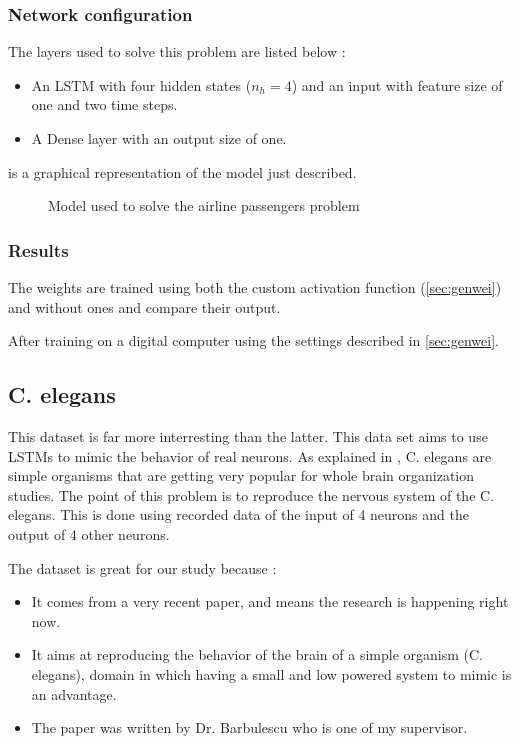 \subsubsection{Network configuration}

The layers used to solve this problem are listed below :

\begin{itemize}
  \item An \ac{LSTM} with four hidden states ($n_h=4$) and an input with feature size of one and two time steps.
  \item A Dense layer with an output size of one.
\end{itemize}

 is a graphical representation of the model just described.

\begin{figure}[H]
  \centering
  
  \caption{Model used to solve the airline passengers problem}
  \label{fig:airlineModel}
\end{figure}

\subsubsection{Results} %

The weights are trained using both the custom activation function (\cref{sec:genwei}) and without ones and compare their output.

After training on a digital computer using the settings described in \cref{sec:genwei}.

\subsection{\ac{C. elegans}}

This dataset is far more interresting than the latter. This data set aims to use \acp{LSTM} to mimic the behavior of real neurons. As explained in \cite{celegans}, \acf{C. elegans} are simple organisms that are getting very popular for whole brain organization studies. The point of this problem is to reproduce the nervous system of the \ac{C. elegans}. This is done using recorded data of the input of 4 neurons and the output of 4 other neurons.

The dataset is great for our study because :
\begin{itemize}
  \item It comes from a very recent paper, and means the research is happening right now.
  \item It aims at reproducing the behavior of the brain of a simple organism (\ac{C. elegans}), domain in which having a small and low powered system to mimic is an advantage.
  \item The paper was written by Dr. Barbulescu who is one of my supervisor.
\end{itemize}
